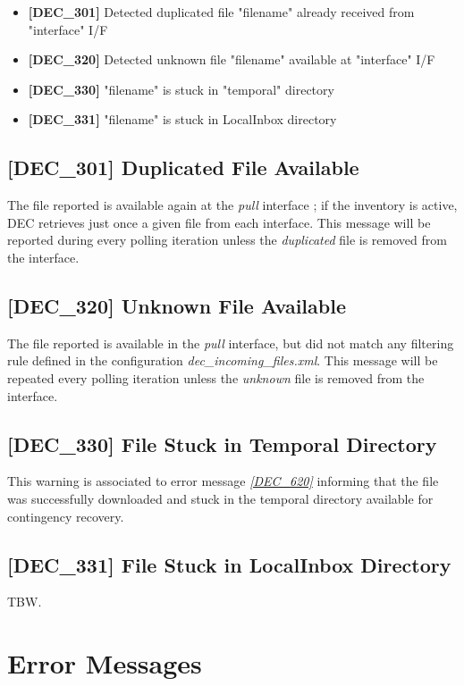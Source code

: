 \documentclass[dec_sum_main.tex]{subfiles}
\begin{document}
\begin{itemize}
	\item \textbf{[DEC\_301]} Detected duplicated file "filename" already received from "interface" I/F
	\item \textbf{[DEC\_320]} Detected unknown file "filename" available at "interface" I/F
	\item \textbf{[DEC\_330]} "filename" is stuck in "temporal" directory
	\item \textbf{[DEC\_331]} "filename" is stuck in LocalInbox directory		
\end{itemize}

\subsection{[DEC\_301] Duplicated File Available}
The file reported is available again at the \textit{pull} interface ; if the inventory is active, DEC retrieves just once a given file from each interface. This message will be reported during every polling iteration unless the \textit{duplicated} file is removed from the interface.

\subsection{[DEC\_320] Unknown File Available}
The file reported is available in the \textit{pull} interface, but did not match any filtering rule defined in the configuration \textit{dec\_incoming\_files.xml}. This message will be repeated every polling iteration unless the \textit{unknown} file is removed from the interface.

\subsection{[DEC\_330] File Stuck in Temporal Directory}
This warning is associated to error message \hyperref[DEC620]{\textit{[DEC\_620]}} informing that the file was successfully downloaded and stuck in the temporal directory available for contingency recovery.

\subsection{[DEC\_331] File Stuck in LocalInbox Directory}
TBW.



\section{Error Messages}
\end{document}
